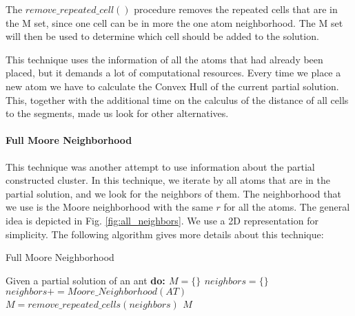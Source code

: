 			The $remove\_repeated\_cell()$ procedure removes the repeated cells that are in the M set, since one cell can be in more the one atom neighborhood.
			The M set will then be used to determine which cell should be added to the solution.

			This technique uses the information of all the atoms that had already been placed, but it demands a lot of computational resources. Every time we place a new atom we have to calculate the Convex Hull of the current partial solution. This, together with the additional time on the calculus of the distance of all cells to the segments, made us look for other alternatives.
			
			\paragraph*{Full Moore Neighborhood}
			This technique was another attempt to use information about the partial constructed cluster.  In this technique, we iterate by all atoms that are in the partial solution, and we look for the neighbors of them. The neighborhood that we use is the Moore neighborhood with the same $r$ for all the atoms. The general idea is depicted in Fig. \ref{fig:all_neighbors}. We use a 2D representation for simplicity. The following algorithm gives more details about this technique:
		
			\begin{algorithm}
				\caption{Full Moore Neighborhood}
				\label{alg:all_atom_neighbors}
				\begin{algorithmic}
				\STATE Given a partial solution of an ant \bf{do}:
				\STATE $M = \{\}$
				\STATE $neighbors = \{\}$
						\STATE $neighbors += Moore\_Neighborhood(AT)$
					\ENDFOR
				\ENDFOR
				\STATE $M = remove\_repeated\_cells(neighbors)$
				\RETURN $M$
				\end{algorithmic}
			\end{algorithm}
		
		
		
